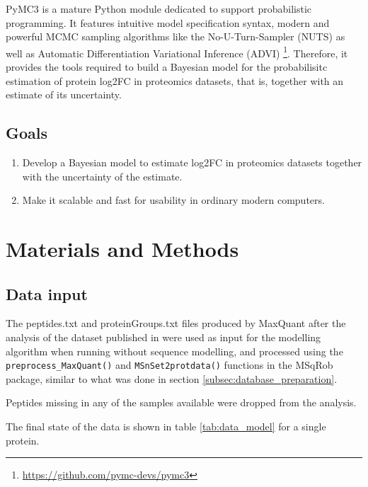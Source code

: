 PyMC3 is a mature Python module dedicated to support probabilistic programming. It features   intuitive model specification syntax, modern and powerful \ac{MCMC} sampling algorithms like the No-U-Turn-Sampler (\ac{NUTS}) as well as Automatic Differentiation Variational Inference (ADVI) \footnote{\href{https://github.com/pymc-devs/pymc3}{https://github.com/pymc-devs/pymc3}}. Therefore, it provides the tools required to build a Bayesian model for the probabilisitc estimation of protein \ac{log2FC} in proteomics datasets, that is, together with an estimate of its uncertainty.


\subsection{Goals}

\begin{enumerate}

\item Develop a Bayesian model to estimate log2FC in proteomics datasets together with the uncertainty of the estimate.

\item Make it scalable and fast for usability in ordinary modern computers.

\end{enumerate}

\section{Materials and Methods}

\subsection{Data input}
\label{subsec:data_input}

The peptides.txt and proteinGroups.txt files produced by MaxQuant \cite{Cox2008} after the analysis of the dataset published in \cite{Cox2014} were used as input for the modelling algorithm when running without sequence modelling, and processed using the \texttt{preprocess\_MaxQuant()} and \texttt{MSnSet2protdata()} functions in the MSqRob \cite{Goeminne2016} package, similar to what was done in section \ref{subsec:database_preparation}.

Peptides missing in any of the samples available were dropped from the analysis.

The final state of the data is shown in table \ref{tab:data_model} for a single protein.

